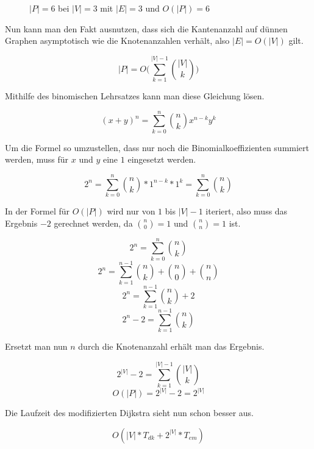 \documentclass[a4paper,10pt,ngerman]{scrartcl}
\begin{document}
\begin{figure}[ht]
\begin{subfigure} {0.16\textwidth}
\begin{tikzpicture}[scale=1]
    \end{tikzpicture}
  \end{subfigure}%
  \begin{subfigure} {0.16\textwidth}
    \centering
  \end{subfigure}%
  \caption{$|P| = 6$ bei $|V| = 3$ mit $|E| = 3$ und $O(|P|) = 6$}
  \label{fig:exthreenodes}
\end{figure}

Nun kann man den Fakt ausnutzen, dass sich die Kantenanzahl auf dünnen Graphen asymptotisch wie die Knotenanzahlen verhält, also $|E| = O(|V|)$ gilt.

$$
|P| = O\bigg(\displaystyle\sum_{k=1}^{|V| - 1} \binom{|V|}{k}\bigg)
$$

Mithilfe des binomischen Lehrsatzes kann man diese Gleichung lösen.

$$
(x + y)^{n} = \displaystyle\sum_{k=0}^{n} \binom{n}{k} x^{n-k} y^{k}
$$

Um die Formel so umzustellen, dass nur noch die Binomialkoeffizienten summiert werden, muss für $x$ und $y$ eine $1$ eingesetzt werden.

$$
2^{n} = \displaystyle\sum_{k=0}^{n} \binom{n}{k}*1^{n-k}*1^{k} = \displaystyle\sum_{k=0}^{n} \binom{n}{k}
$$

In der Formel für $O(|P|)$ wird nur von $1$ bis $|V| - 1$ iteriert, also muss das Ergebnis $- 2$ gerechnet werden, da $\binom{n}{0} = 1$ und $\binom{n}{n} = 1$ ist.

$$ 2^{n} = \displaystyle\sum_{k=0}^{n} \binom{n}{k} $$
$$ 2^{n} = \displaystyle\sum_{k=1}^{n-1} \binom{n}{k} + \binom{n}{0} + \binom{n}{n} $$
$$ 2^{n} = \displaystyle\sum_{k=1}^{n-1} \binom{n}{k} + 2 $$
$$ 2^{n} - 2 = \displaystyle\sum_{k=1}^{n-1} \binom{n}{k} $$

Ersetzt man nun $n$ durch die Knotenanzahl erhält man das Ergebnis.

$$ 2^{|V|} - 2 = \displaystyle\sum_{k=1}^{|V| - 1} \binom{|V|}{k} $$
$$ O(|P|) = 2^{|V|} - 2 = 2^{|V|} $$

Die Laufzeit des modifizierten Dijkstra sieht nun schon besser aus.

$$ O(|V| * T_{dk} + 2^{|V|} * T_{em}) $$
\end{document}
